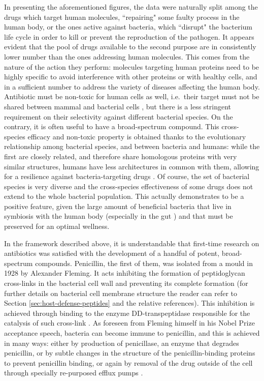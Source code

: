 In presenting the aforementioned figures, the data were naturally split among the drugs which target human molecules, ``repairing" some faulty process in the human body, or the ones active against bacteria, which ``disrupt" the bacterium life cycle in order to kill or prevent the reproduction of the pathogen.
%
It appears evident that the pool of drugs available to the second purpose are in consistently lower number than the ones addressing human molecules. This comes from the nature of the action they perform: molecules targeting human proteins need to be highly specific to avoid interference with other proteins or with healthy cells, and in a sufficient number to address the variety of diseases affecting the human body.
%
Antibiotic must be non-toxic for human cells as well, i.e.\ their target must not be shared between mammal and bacterial cells \cite{???}, but there is a less stringent requirement on their selectivity against different bacterial species. On the contrary, it is often useful to have a broad-spectrum compound. This cross-species efficacy and non-toxic property is obtained thanks to the evolutionary relationship among bacterial species, and between bacteria and humans: while the first are closely related, and therefore share homologous proteins with very similar structures, humans have less architectures in common with them, allowing for a resilience against bacteria-targeting drugs \cite{???}.
%
Of course, the set of bacterial species is very diverse and the cross-species effectiveness of some drugs does not extend to the whole bacterial population. This actually demonstrates to be a positive feature, given the large amount of beneficial bacteria that live in symbiosis with the human body (especially in the gut \cite{???}) and that must be preserved for an optimal wellness.

In the framework described above, it is understandable that first-time research on antibiotics was satisfied with the development of a handful of potent, broad-spectrum compounds.
%
Penicillin, the first of them, was isolated from a mould in 1928 by Alexander Fleming. It acts inhibiting the formation of peptidoglycan cross-links in the bacterial cell wall and preventing its complete formation (for further details on bacterial cell membrane structure the reader can refer to Section \ref{sec:host-defense-peptides} and the relative references). This inhibition is achieved through binding to the enzyme DD-transpeptidase responsible for the catalysis of such cross-link \cite{Gordon2000}.
%
As foreseen from Fleming himself in his Nobel Prize acceptance speech, bacteria can become immune to penicillin, and this is achieved in many ways: either by production of penicillase, an enzyme that degrades penicillin, or by subtle changes in the structure of the penicillin-binding proteins to prevent penicillin binding, or again by removal of the drug outside of the cell through specially re-purposed efflux pumps \cite{???}.

